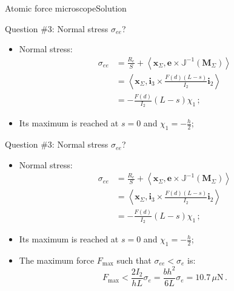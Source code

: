 \documentclass{beamer}
\newcommand{\xj}{x}
\newcommand{\xv}{{\boldsymbol\xj}}
\newcommand{\ej}{e}
\renewcommand{\ij}{i}
\newcommand{\ev}{{\boldsymbol\ej}}
\newcommand{\iv}{{\boldsymbol\ij}}
\newcommand*{\xiu}{\chi_1}
\newcommand*{\Mstaticj}{J}
\newcommand*{\Mstatic}{{\mathbb\Mstaticj}}
\newcommand*{\stressj}{\sigma}
\newcommand{\Fresj}{R}
\newcommand{\Mresj}{M}
\newcommand{\Mres}{{\boldsymbol\Mresj}}
\newcommand{\scal}[1]{\left\langle{#1}\right\rangle}
\begin{document}
\begin{frame}{Atomic force microscope}{Solution}
\begin{overprint}
\vskip-20pt
\begin{exampleblock}{Question \#3: Normal stress $\stressj_{ee}$?}
\begin{itemize}
\item Normal stress:
\begin{displaymath}
\begin{split}
\stressj_{ee} &=\frac{\Fresj_e}{S}+\scal{\xv_\Sigma,\ev\times\Mstatic^{-1}(\Mres_\Sigma)} \\
&=\scal{\xv_\Sigma,\iv_3\times \frac{F(d)(L-s)}{I_2}\iv_2}\\
&=- \frac{F(d)}{I_2}(L-s)\xiu\,;
\end{split}
\end{displaymath}
\item Its maximum is reached at $s=0$ and $\xiu=-\frac{h}{2}$;
\end{itemize}
\end{exampleblock}

\vskip-20pt
\begin{exampleblock}{Question \#3: Normal stress $\stressj_{ee}$?}
\begin{itemize}
\item Normal stress:
\begin{displaymath}
\begin{split}
\stressj_{ee} &=\frac{\Fresj_e}{S}+\scal{\xv_\Sigma,\ev\times\Mstatic^{-1}(\Mres_\Sigma)} \\
&=\scal{\xv_\Sigma,\iv_3\times \frac{F(d)(L-s)}{I_2}\iv_2}\\
&=- \frac{F(d)}{I_2}(L-s)\xiu\,;
\end{split}
\end{displaymath}
\item Its maximum is reached at $s=0$ and $\xiu=-\frac{h}{2}$;
\item The maximum force $F_\text{max}$ such that $\stressj_{ee}<\stressj_e$ is:
\begin{displaymath}
F_\text{max}<\frac{2I_2}{hL}\stressj_e=\frac{bh^2}{6L}\stressj_e=10.7\,\mu\text{N}\,.
\end{displaymath}
\end{itemize}
\end{exampleblock}

\end{overprint}

\end{frame}

%
%
%
\end{document}
